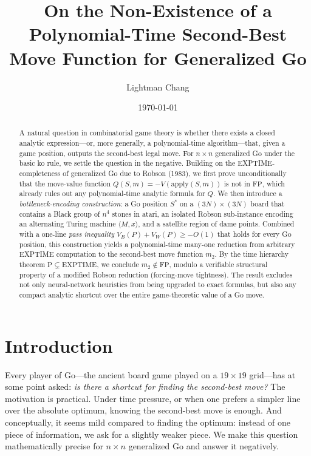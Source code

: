 \documentclass[11pt,a4paper]{amsart}
\title{On the Non-Existence of a Polynomial-Time
  Second-Best Move Function for Generalized Go}
\author{Lightman Chang}
\date{\today}
\theoremstyle{plain}
\theoremstyle{definition}
\theoremstyle{remark}
\newcommand{\FP}{\mathrm{FP}}
\newcommand{\PTIME}{\mathrm{P}}
\newcommand{\EXPTIME}{\mathrm{EXPTIME}}
\newcommand{\Apply}{\mathrm{apply}}
\begin{document}
\maketitle

\begin{abstract}
A natural question in combinatorial game theory is whether there exists
a closed analytic expression---or, more generally, a polynomial-time
algorithm---that, given a game position, outputs the second-best legal
move. For $n \times n$ generalized Go under the basic ko rule, we settle
the question in the negative. Building on the EXPTIME-completeness of
generalized Go due to Robson (1983), we first prove unconditionally that
the move-value function $Q(S,m) = -V(\Apply(S,m))$ is not in $\FP$,
which already rules out any polynomial-time analytic formula for $Q$.
We then introduce a \emph{bottleneck-encoding construction}: a Go
position $S^*$ on a $(3N) \times (3N)$ board that contains a Black group
of $n^4$ stones in atari, an isolated Robson sub-instance encoding an
alternating Turing machine $\langle M,x\rangle$, and a satellite region
of dame points. Combined with a one-line \emph{pass inequality}
$V_B(P) + V_W(P) \geq -O(1)$ that holds for every Go position,
this construction yields a polynomial-time many-one reduction from
arbitrary EXPTIME computation to the second-best move function $m_2$.
By the time hierarchy theorem $\PTIME \subsetneq \EXPTIME$,
we conclude $m_2 \notin \FP$, modulo a verifiable structural property of
a modified Robson reduction (forcing-move tightness). The result excludes
not only neural-network heuristics from being upgraded to exact
formulas, but also any compact analytic shortcut over the entire
game-theoretic value of a Go move.
\end{abstract}

\section{Introduction}
\label{sec:intro}

Every player of Go---the ancient board game played on a $19 \times 19$
grid---has at some point asked: \emph{is there a shortcut for finding
the second-best move?} The motivation is practical. Under time pressure,
or when one prefers a simpler line over the absolute optimum, knowing
the second-best move is enough. And conceptually, it seems mild compared
to finding the optimum: instead of one piece of information, we ask for
a slightly weaker piece. We make this question mathematically precise
for $n \times n$ generalized Go and answer it negatively.
\end{document}

